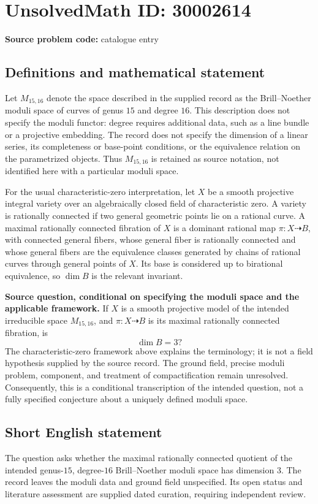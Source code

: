 \documentclass[11pt]{article}
\begin{document}
\section*{UnsolvedMath ID: 30002614}
\textbf{Source problem code:} catalogue entry
\subsection{Definitions and mathematical statement}
Let \(M_{15,16}\) denote the space described in the supplied record as the Brill--Noether moduli space of curves of genus \(15\) and degree \(16\). This description does not specify the moduli functor: degree requires additional data, such as a line bundle or a projective embedding. The record does not specify the dimension of a linear series, its completeness or base-point conditions, or the equivalence relation on the parametrized objects. Thus \(M_{15,16}\) is retained as source notation, not identified here with a particular moduli space.

For the usual characteristic-zero interpretation, let \(X\) be a smooth projective integral variety over an algebraically closed field of characteristic zero. A variety is rationally connected if two general geometric points lie on a rational curve. A maximal rationally connected fibration of \(X\) is a dominant rational map \(\pi\colon X\dashrightarrow B\), with connected general fibers, whose general fiber is rationally connected and whose general fibers are the equivalence classes generated by chains of rational curves through general points of \(X\). Its base is considered up to birational equivalence, so \(\dim B\) is the relevant invariant.

\textbf{Source question, conditional on specifying the moduli space and the applicable framework.} If \(X\) is a smooth projective model of the intended irreducible space \(M_{15,16}\), and \(\pi\colon X\dashrightarrow B\) is its maximal rationally connected fibration, is
\[
\dim B=3?
\]
The characteristic-zero framework above explains the terminology; it is not a field hypothesis supplied by the source record. The ground field, precise moduli problem, component, and treatment of compactification remain unresolved. Consequently, this is a conditional transcription of the intended question, not a fully specified conjecture about a uniquely defined moduli space.
\subsection{Short English statement}
The question asks whether the maximal rationally connected quotient of the intended genus-\(15\), degree-\(16\) Brill--Noether moduli space has dimension \(3\). The record leaves the moduli data and ground field unspecified. Its open status and literature assessment are supplied dated curation, requiring independent review.
\end{document}
